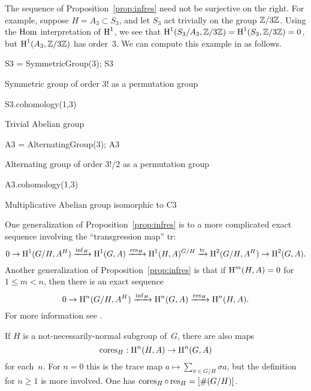 \begin{example}
	The sequence of Proposition~\ref{prop:infres} need not be
	surjective on the right.  For example, suppose $H=A_3 \subset S_3$,
	and let $S_3$ act trivially on the group $\mathbb{Z}/3\mathbb{Z}$.
	Using the $\operatorname{Hom}$ interpretation of $\operatorname{H}^1$, we see
	that
	$\operatorname{H}^1(S_3/A_3, \mathbb{Z}/3\mathbb{Z}) = \operatorname{H}^1(S_3, \mathbb{Z}/3\mathbb{Z}) = 0$, but
	$\operatorname{H}^1(A_3, \mathbb{Z}/3\mathbb{Z})$ has order~$3$.
	We can compute this example in \sage as follows.
\begin{sagecode}
\begin{sagecell}
S3 = SymmetricGroup(3); S3
\end{sagecell}
\begin{sageout}
Symmetric group of order 3! as a permutation group
\end{sageout}
\begin{sagecell}
S3.cohomology(1,3)
\end{sagecell}
\begin{sageout}
Trivial Abelian group
\end{sageout}
\begin{sagecell}
A3 = AlternatingGroup(3); A3
\end{sagecell}
\begin{sageout}
Alternating group of order 3!/2 as a permutation group
\end{sageout}
\begin{sagecell}
A3.cohomology(1,3)
\end{sagecell}
\begin{sageout}
Multiplicative Abelian group isomorphic to C3
\end{sageout}
\end{sagecode}
\end{example}


\begin{remark}
	One generalization of Proposition~\ref{prop:infres} is to
	a more complicated exact sequence involving the ``transgression map''
	tr:
	$$
		0 \to \operatorname{H}^1(G/H, A^H)\xrightarrow{\operatorname{inf}_H} \operatorname{H}^1(G,A)\xrightarrow{\operatorname{res}_H} \operatorname{H}^1(H,A)^{G/H}
		\xrightarrow{{\rm tr}}  \operatorname{H}^2(G/H,A^H) \to \operatorname{H}^2(G,A).
	$$
	Another generalization of Proposition~\ref{prop:infres}
	is that if $\operatorname{H}^m(H,A) = 0$ for $1\leq m < n$, then
	there is an exact sequence
	$$
		0 \to \operatorname{H}^n(G/H, A^H)\xrightarrow{\operatorname{inf}_H}  \operatorname{H}^n(G,A)\xrightarrow{\operatorname{res}_H} \operatorname{H}^n(H,A).
	$$
	For more information see \cite[Ch.~VII.6]{serre:localfields}.
\end{remark}

\begin{remark}\label{rmk:cores}
	If $H$ is a not-necessarily-normal subgroup of~$G$, there are also
	maps
	$$
		\operatorname{cores}_H: \operatorname{H}^n(H,A) \to \operatorname{H}^n(G,A)
	$$
	for each~$n$.  For $n=0$ this is the trace map
	$a\mapsto \sum_{\sigma \in G/H} \sigma a$, but the
	definition for $n\geq 1$ is more involved. One has
	$\operatorname{cores}_H \circ \operatorname{res}_H = [\#(G/H)]$.
\end{remark}

